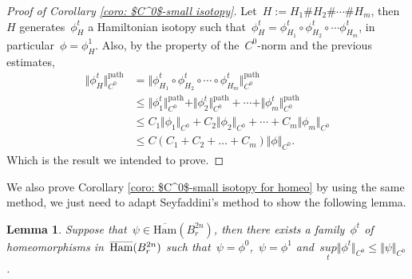 \documentclass[10pt]{amsart}
\newtheorem{lemma}[prop]{Lemma}
\newcommand{\Ham}{\mathrm{Ham}}
\begin{document}
\begin{proof}[Proof of Corollary \ref{coro: $C^0$-small isotopy}]
Let~$H:=H_1 \# H_2 \# \cdots \# H_m$, then~$H$ generates~$\phi_H^t$ a Hamiltonian isotopy such that~$\phi_{H}^t=\phi_{H_1}^t\circ \phi_{H_2}^t\circ \cdots \phi_{H_m}^t$, in particular~$\phi=\phi_H^1$. Also, by the property of the~$C^0$-norm and the previous estimates,
\begin{align*}
	\Vert\phi_{H}^t \Vert_{C^0}^{\text{path}}&=\Vert\phi_{H_1}^t\circ \phi_{H_2}^t\circ \cdots \circ \phi_{H_m}^t \Vert_{C^0}^{\text{path}}\\
	&\leq \Vert \phi_1^t \Vert_{C^0}^{\text{path}} +\Vert \phi_2^t \Vert_{C^0}^{\text{path}}+\cdots + \Vert \phi_m^t \Vert_{C^0}^{\text{path}}\\
	&\leq C_1 \Vert \phi_1\Vert_{C^0}+C_2 \Vert \phi_2 \Vert_{C^0}+\cdots + C_m\Vert \phi_m \Vert_{C^0}\\
	&\leq C(C_1+C_2+\ldots+C_m) \Vert \phi \Vert_{C^0}.
\end{align*}
Which is the result we intended to prove.
\end{proof}

We also prove Corollary \ref{coro: $C^0$-small isotopy for homeo} by using the same method, we just need to adapt Seyfaddini's method to show the following lemma.

\begin{lemma}\label{lem: clever Alexander's trick for homeo}
	Suppose that~$\psi \in \overline{\Ham}(B_r^{2n})$, then there exists a family~$\phi^t$ of homeomorphisms in~$\smash[t]{\overline{\Ham}(B_r^{2n})}$ such that~$\psi=\phi^0$,~$\psi=\phi^1$ and~$\underset{t}{sup} \Vert\phi^t \Vert_{C^0}\leq \Vert \psi \Vert_{C^0}$.
\end{lemma}
\end{document}
